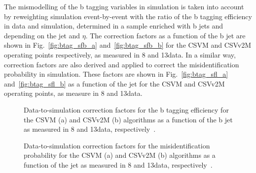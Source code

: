 The mismodelling of the b tagging variables in simulation is taken into account by reweighting simulation event-by-event with the ratio of the b tagging efficiency in data and simulation, determined in a sample enriched with b jets and depending on the jet \pt and $\eta$. The correction factors as a function of the b jet \pt  are shown in Fig.~\ref{fig:btag_sfb_a} and~\ref{fig:btag_sfb_b} for the CSVM and CSVv2M operating points respectively, as measured in 8 and 13\TeV data. In a similar way, correction factors are also derived and applied to correct the misidentification probability in simulation. These factors are shown in Fig.~\ref{fig:btag_sfl_a} and~\ref{fig:btag_sfl_b} as a function of the jet \pt for the CSVM and CSVv2M operating points, as measure in 8 and 13\TeV data.

\begin{figure}[!htb]
\begin{center}
\end{center} 
\caption{Data-to-simulation correction factors for the b tagging efficiency for the CSVM (a) and CSVv2M (b) algorithms as a function of the b jet \pt as measured in 8 and 13\TeV data, respectively~\cite{CMS:BTV13001,CMS-PAS-BTV-15-001}.}
\label{fig:btag_sfb}
\end{figure}

\begin{figure}[!htb]
\begin{center}
\end{center} 
\caption{Data-to-simulation correction factors for the misidentification probability for the CSVM (a) and CSVv2M (b) algorithms as a function of the jet \pt as measured in 8 and 13\TeV data, respectively~\cite{CMS:BTV13001,CMS-PAS-BTV-15-001}.}
\label{fig:btag_sfl}
\end{figure}